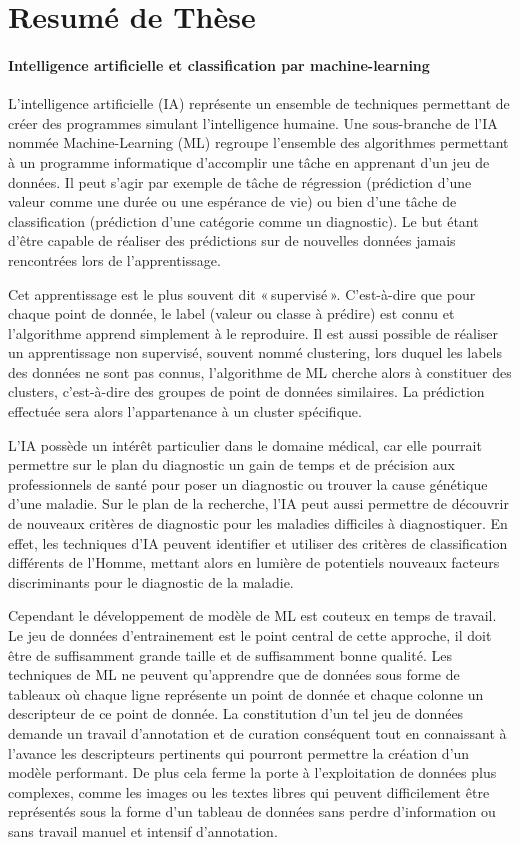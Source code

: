 \chapter*{Resumé de Thèse}
\subsubsection{Intelligence artificielle et classification par machine-learning}
L’intelligence artificielle (IA) représente un ensemble de techniques permettant de créer des programmes simulant l’intelligence humaine.  Une sous-branche de l’IA nommée Machine-Learning (ML) regroupe l’ensemble des algorithmes permettant à un programme informatique d’accomplir une tâche en apprenant d’un jeu de données. Il peut s’agir par exemple de tâche de régression (prédiction d’une valeur comme une durée ou une espérance de vie) ou bien d’une tâche de classification (prédiction d’une catégorie comme un diagnostic). Le but étant d’être capable de réaliser des prédictions sur de nouvelles données jamais rencontrées lors de l’apprentissage. 

Cet apprentissage est le plus souvent dit « supervisé ». C’est-à-dire que pour chaque point de donnée, le label (valeur ou classe à prédire) est connu et l’algorithme apprend simplement à le reproduire. Il est aussi possible de réaliser un apprentissage non supervisé, souvent nommé clustering, lors duquel les labels des données ne sont pas connus, l’algorithme de ML cherche alors à constituer des clusters, c’est-à-dire des groupes de point de données similaires. La prédiction effectuée sera alors l’appartenance à un cluster spécifique.

L’IA  possède un intérêt particulier dans le domaine médical, car elle pourrait  permettre sur le plan du diagnostic un gain de temps et de précision aux professionnels de santé pour poser un diagnostic ou trouver la cause génétique d’une maladie. Sur le plan de la recherche, l’IA peut aussi permettre de découvrir de nouveaux critères de diagnostic pour les maladies difficiles à diagnostiquer. En effet, les techniques d’IA peuvent identifier et utiliser des critères de classification différents de l’Homme, mettant alors en lumière de potentiels nouveaux facteurs discriminants pour le diagnostic de la maladie.

Cependant le développement de modèle de ML est couteux en temps de travail. Le jeu de données d’entrainement est le point central de cette approche, il doit être de suffisamment grande taille et de suffisamment bonne qualité. Les techniques de ML ne peuvent qu’apprendre que de données sous forme de tableaux où chaque ligne représente un point de donnée et chaque colonne un descripteur de ce point de donnée. La constitution d’un tel jeu de données demande un travail d’annotation et de curation conséquent tout en connaissant à l’avance les descripteurs pertinents qui pourront permettre la création d’un modèle performant. De plus cela ferme la porte à l’exploitation de données plus complexes, comme les images ou les textes libres qui peuvent difficilement être représentés sous la forme d’un tableau de données sans perdre d’information ou sans travail manuel et intensif d’annotation.

